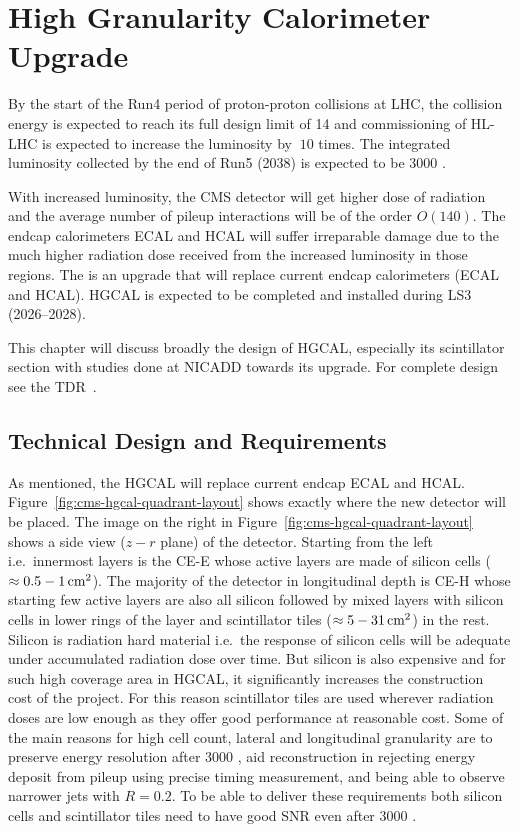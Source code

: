 \chapter{
  High Granularity Calorimeter Upgrade
 }\label{ch_hgcal}

By the start of the Run4 period of proton-proton collisions
at \gls{LHC}, the collision energy is expected to
reach its full design limit of 14 \TeV{} and
commissioning of \gls{HL-LHC} is expected to
increase the luminosity by \(~10\) times.
The integrated luminosity collected by the end of Run5 (2038)
is expected to be 3000 \fbinv{}.

With increased luminosity, the \gls{CMS} detector will get
higher dose of radiation and the average number of pileup interactions
will be of the order \( O(140) \). The endcap calorimeters \gls{ECAL} and \gls{HCAL} will suffer
irreparable damage due to the much higher radiation dose received
from the increased luminosity in those regions.
The  is an upgrade that will replace current endcap calorimeters
(\gls{ECAL} and \gls{HCAL}).
\gls{HGCAL} is expected to be completed and installed
during \gls{LS3} (2026--2028).

This chapter will discuss broadly the design
of \gls{HGCAL}, especially its scintillator section with
studies done at \gls{NICADD} towards its upgrade.
For complete design see the \gls{TDR}~\cite{cms-hgcal-tdr}.

\section{
  Technical Design and Requirements
 }\label{ch_hgcal:technical-design}

As mentioned, the \gls{HGCAL} will replace current endcap \gls{ECAL} and
\gls{HCAL}. Figure~\ref{fig:cms-hgcal-quadrant-layout}
shows exactly where the new detector will be placed. The image on the right in
Figure~\ref{fig:cms-hgcal-quadrant-layout} shows a side view (\( z-r \) plane)
of the detector. Starting from the left i.e.~innermost layers is the
\gls{CE-E} whose active layers are made of silicon cells
(\( \approx 0.5-1 \,\text{cm}{}^2\)). The
majority of the detector in longitudinal depth is \gls{CE-H}
whose starting few active layers are also all silicon followed
by mixed layers with silicon cells in lower rings of the
layer and scintillator tiles (\( \approx 5-31 \,\text{cm}{}^2\)) in the rest.
Silicon is radiation hard material i.e.~the response of silicon cells
will be adequate under accumulated radiation dose over time. But
silicon is also expensive and for such high coverage area in \gls{HGCAL},
it significantly increases the construction cost of the project. For this
reason scintillator tiles are used wherever radiation doses are low
enough as they offer good performance at reasonable cost.
Some of the main reasons for high cell count, lateral and longitudinal granularity
are to preserve energy resolution after 3000 \fbinv{}, aid 
reconstruction in rejecting energy deposit from pileup using precise timing measurement, and
being able to observe narrower jets with \( R = 0.2 \).
To be able to deliver these requirements both silicon cells and scintillator tiles
need to have good \gls{SNR} even after 3000 \fbinv{}.

